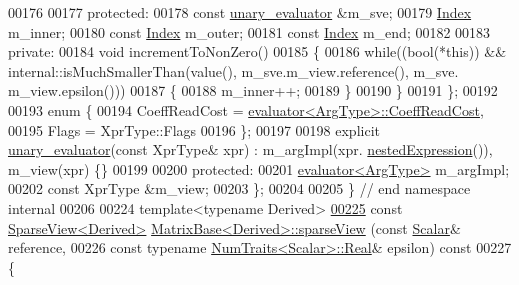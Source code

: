 \begin{DoxyCode}
00176 
00177       \textcolor{keyword}{protected}:
00178         \textcolor{keyword}{const} \hyperlink{struct_eigen_1_1internal_1_1unary__evaluator}{unary\_evaluator} &m\_sve;
00179         \hyperlink{namespace_eigen_a62e77e0933482dafde8fe197d9a2cfde}{Index} m\_inner;
00180         \textcolor{keyword}{const} \hyperlink{namespace_eigen_a62e77e0933482dafde8fe197d9a2cfde}{Index} m\_outer;
00181         \textcolor{keyword}{const} \hyperlink{namespace_eigen_a62e77e0933482dafde8fe197d9a2cfde}{Index} m\_end;
00182 
00183       \textcolor{keyword}{private}:
00184         \textcolor{keywordtype}{void} incrementToNonZero()
00185         \{
00186           \textcolor{keywordflow}{while}((\textcolor{keywordtype}{bool}(*\textcolor{keyword}{this})) && internal::isMuchSmallerThan(value(), m\_sve.m\_view.reference(), m\_sve.
      m\_view.epsilon()))
00187           \{
00188             m\_inner++;
00189           \}
00190         \}
00191     \};
00192     
00193     \textcolor{keyword}{enum} \{
00194       CoeffReadCost = \hyperlink{struct_eigen_1_1internal_1_1evaluator}{evaluator<ArgType>::CoeffReadCost},
00195       Flags = XprType::Flags
00196     \};
00197     
00198     \textcolor{keyword}{explicit} \hyperlink{struct_eigen_1_1internal_1_1unary__evaluator}{unary\_evaluator}(\textcolor{keyword}{const} XprType& xpr) : m\_argImpl(xpr.
      \hyperlink{group___sparse_core___module_a50f53a9405017012077ae907959aca14}{nestedExpression}()), m\_view(xpr) \{\}
00199 
00200   \textcolor{keyword}{protected}:
00201     \hyperlink{struct_eigen_1_1internal_1_1evaluator}{evaluator<ArgType>} m\_argImpl;
00202     \textcolor{keyword}{const} XprType &m\_view;
00203 \};
00204 
00205 \} \textcolor{comment}{// end namespace internal}
00206 
00224 \textcolor{keyword}{template}<\textcolor{keyword}{typename} Derived>
\hyperlink{group___sparse_core___module_ga320dd291cbf4339c6118c41521b75350}{00225} \textcolor{keyword}{const} \hyperlink{group___sparse_core___module_class_eigen_1_1_sparse_view}{SparseView<Derived>} \hyperlink{group___sparse_core___module_ga320dd291cbf4339c6118c41521b75350}{MatrixBase<Derived>::sparseView}
      (\textcolor{keyword}{const} \hyperlink{group___core___module_a5feed465b3a8e60c47e73ecce83e39a2}{Scalar}& reference,
00226                                                           \textcolor{keyword}{const} \textcolor{keyword}{typename} 
      \hyperlink{group___core___module_struct_eigen_1_1_num_traits}{NumTraits<Scalar>::Real}& epsilon)\textcolor{keyword}{ const}
00227 \textcolor{keyword}{}\{

\end{DoxyCode}
